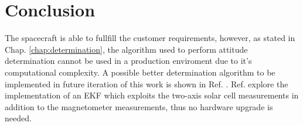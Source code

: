 \documentclass[11pt,a4paper]{report}
\begin{document}
\chapter{Conclusion}
The spacecraft is able to fullfill the customer requirements, however, as stated in Chap. \ref{chap:determination}, the algorithm used to perform attitude determination cannot be used in a production enviroment due to it's computational complexity.
A possible better determination algorithm to be implemented in future iteration of this work is shown in Ref. \cite{Ref:Articles:Pela}.
Ref. \cite{Ref:Articles:Pela} explore the implementation of an EKF which exploits the two-axis solar cell measurements in addition to the magnetometer measurements, thus no hardware upgrade is needed.
\newpage
\end{document}
